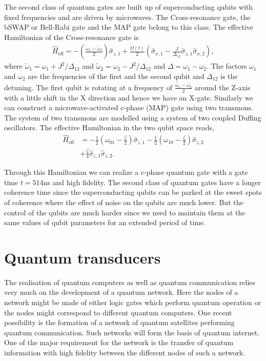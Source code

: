 \documentclass[twocolumn, aps, rmp, amsmath, amssymb, nofootinbib, superscriptaddress, longbibliography, floatfix, table-of-contents, eqsecnum]{revtex4-1}
\begin{document}
The second class of quantum gates are built up of superconducting qubits with fixed frequencies and are driven by microwaves. The Cross-resonance gate, the bSWAP or Bell-Rabi gate and the MAP gate belong to this class. The effective Hamiltonian of the Cross-resonance gate is 
\begin{align}
\hat{H}_\mathrm{eff} = - \left( \frac{\tilde{\omega}_{1} - \tilde{\omega}_2}{2} \right) \hat\sigma_{z,1} + \frac{\Omega(t)}{2} \left(\hat\sigma_{x,1} - \frac{J}{\Delta_{12}} \hat\sigma_{z,1} \hat\sigma_{x,2} \right),
\end{align}
where $\tilde{\omega}_{1} = \omega_{1} + J^{2}/\Delta_{12}$ and $\tilde{\omega}_{2} = \omega_{2} - J^{2}/\Delta_{12}$ and $\Delta = \omega_{1} -\omega_{2}$. The factors $\omega_{1}$ and $\omega_{2}$ are the frequencies of the first and the second qubit and $\Delta_{12}$ is the detuning. The first qubit is rotating at a frequency of $\frac{\tilde{\omega_{1}} - \tilde{\omega_{2}}}{2}$ around the Z-axis with a little shift in the X direction and hence we have an X-gate. Similarly we can construct a microwave-activated c-phase (MAP) gate using two transmons. The system of two transmons are modelled using a system of two coupled Duffing oscillators. The effective Hamiltonian in the two qubit space reads,
\begin{align}
\hat{H}_\mathrm{eff} &= - \frac{1}{2} \left( \omega_{01} - \frac{\zeta}{2} \right) \hat\sigma_{z,1} - \frac{1}{2} \left( \omega_{10} - \frac{\zeta}{2} \right) \hat\sigma_{z,2} \nonumber\\
&+ \frac{\zeta}{4} \hat\sigma_{z,1} \hat\sigma_{z,2}. 
\end{align}

Through this Hamiltonian we can realize a c-phase quantum gate with a gate time $t = 514$ns and high fidelity. The second class of quantum gates have a longer coherence time since the superconducting qubits can be parked at the sweet spots of coherence where the effect of noise on the qubits are much lower. But the control of the qubits are much harder since we need to maintain them at the same values of qubit parameters for an extended period of time.

\section{Quantum transducers}

The realisation of quantum computers as well as quantum communication relies very much on the development of a quantum network. Here the nodes of a network might be made of either logic gates which perform quantum operation or the nodes might correspond to different quantum computers. One recent possibility is the formation of a network of quantum satellites performing quantum communication. Such networks will form the basis of quantum internet. One of the major requirement for the network is the transfer of quantum information with high fidelity between the different nodes of such a network. 
\end{document}
